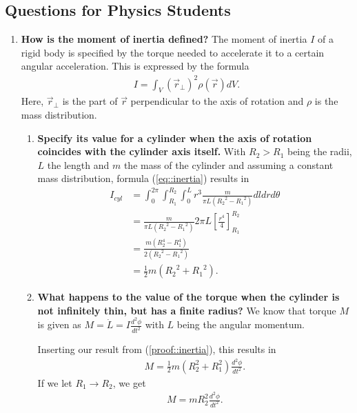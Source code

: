 \subsection{Questions for Physics Students}
\begin{enumerate}
	\item \textbf{How is the moment of inertia defined?}
	The moment of inertia $I$ of a rigid body is specified by the torque needed to accelerate it to a certain angular acceleration. This is expressed by the formula
	\begin{align}
		I = \int_{V} (\vec{r}_\perp)^2 \rho (\vec{r}) dV.
		\label{eq::inertia}
	\end{align}
	Here, $\vec{r}_\perp$ is the part of $\vec{r}$ perpendicular to the axis of rotation and $\rho$ is the mass distribution.
	
	\begin{enumerate}
		\item 
		\textbf{Specify its value for a cylinder when the axis of rotation coincides with the cylinder axis itself.}
	 	With $R_2 > R_1$ being the radii, $L$ the length and $m$ the mass of the cylinder and assuming a constant mass distribution, formula (\ref{eq::inertia}) results in
		\begin{align}
			I_{cyl}{}
			&=\int_{0}^{2 \pi} \int_{R_1}^{R_2} \int_{0}^{L} r^3 \frac{m}{\pi L ({R_2}^2 - {R_1}^2)} dl dr d\theta \\
			&= \frac{m}{\pi L ({R_2}^2 - {R_1}^2)} 2 \pi L \left[ \frac{r^4}{4}\right]_{R_1}^{R_2} \\
			&= \frac{m (R_2^4-R_1^4)}{2 ({R_2}^2 - {R_1}^2)} \\
			&= \frac{1}{2}m({R_2}^2 + {R_1}^2).
			\label{proof::inertia}
		\end{align}

	 	
 		\item
 		\textbf{What happens to the value of the torque when the cylinder is not infinitely thin, but has a finite radius?}
 		We know that torque $M$ is given as $M = \dot{L} = I \frac{d^2 \phi}{d t^2}$ with $L$ being the angular momentum.
 		
 		Inserting our result from (\ref{proof::inertia}), this results in
 		\begin{align*}
 			M = \frac{1}{2} m (R_2^2 + R_1^2) \frac{d^2 \phi}{d t^2}.
 		\end{align*}
 		If we let $R_1 \rightarrow R_2$, we get
 		\begin{align*}
 			M = m R_2^2 \frac{d^2 \phi}{d t^2}.
 		\end{align*}
 		

\end{enumerate}
\end{enumerate}
